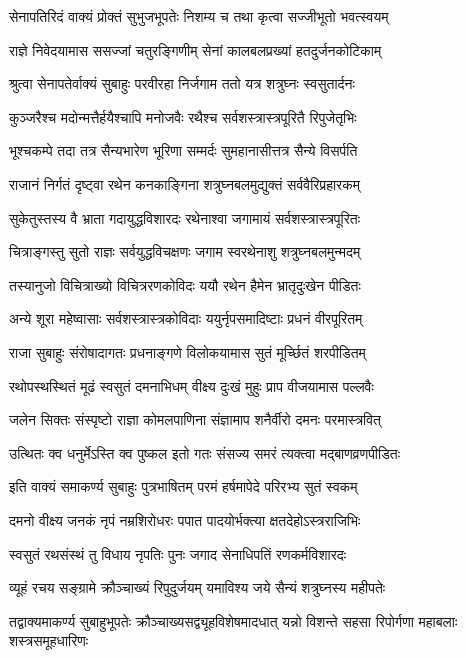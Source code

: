 \twolineshloka
{सेनापतिरिदं वाक्यं प्रोक्तं सुभुजभूपतेः}
{निशम्य च तथा कृत्वा सज्जीभूतो भवत्स्वयम्}%

\twolineshloka
{राज्ञे निवेदयामास ससज्जां चतुरङ्गिणीम्}
{सेनां कालबलप्रख्यां हतदुर्जनकोटिकाम्}%

\twolineshloka
{श्रुत्वा सेनापतेर्वाक्यं सुबाहुः परवीरहा}
{निर्जगाम ततो यत्र शत्रुघ्नः स्वसुतार्दनः}%

\twolineshloka
{कुञ्जरैश्च मदोन्मत्तैर्हयैश्चापि मनोजवैः}
{रथैश्च सर्वशस्त्रास्त्रपूरितै रिपुजेतृभिः}%

\twolineshloka
{भूश्चकम्पे तदा तत्र सैन्यभारेण भूरिणा}
{सम्मर्दः सुमहानासीत्तत्र सैन्ये विसर्पति}%

\twolineshloka
{राजानं निर्गतं दृष्ट्वा रथेन कनकाङ्गिना}
{शत्रुघ्नबलमुद्युक्तं सर्ववैरिप्रहारकम्}%

\twolineshloka
{सुकेतुस्तस्य वै भ्राता गदायुद्धविशारदः}
{रथेनाश्वा जगामायं सर्वशस्त्रास्त्रपूरितः}%

\twolineshloka
{चित्राङ्गस्तु सुतो राज्ञः सर्वयुद्धविचक्षणः}
{जगाम स्वरथेनाशु शत्रुघ्नबलमुन्मदम्}%

\twolineshloka
{तस्यानुजो विचित्राख्यो विचित्ररणकोविदः}
{ययौ रथेन हैमेन भ्रातृदुःखेन पीडितः}%

\twolineshloka
{अन्ये शूरा महेष्वासाः सर्वशस्त्रास्त्रकोविदाः}
{ययुर्नृपसमादिष्टाः प्रधनं वीरपूरितम्}%

\twolineshloka
{राजा सुबाहुः संरोषादागतः प्रधनाङ्गणे}
{विलोकयामास सुतं मूर्च्छितं शरपीडितम्}%

\twolineshloka
{रथोपस्थस्थितं मूढं स्वसुतं दमनाभिधम्}
{वीक्ष्य दुःखं मुहुः प्राप वीजयामास पल्लवैः}%

\twolineshloka
{जलेन सिक्तः संस्पृष्टो राज्ञा कोमलपाणिना}
{संज्ञामाप शनैर्वीरो दमनः परमास्त्रवित्}%

\twolineshloka
{उत्थितः क्व धनुर्मेऽस्ति क्व पुष्कल इतो गतः}
{संसज्य समरं त्यक्त्वा मद्बाणव्रणपीडितः}%

\twolineshloka
{इति वाक्यं समाकर्ण्य सुबाहुः पुत्रभाषितम्}
{परमं हर्षमापेदे परिरभ्य सुतं स्वकम्}%

\twolineshloka
{दमनो वीक्ष्य जनकं नृपं नम्रशिरोधरः}
{पपात पादयोर्भक्त्या क्षतदेहोऽस्त्रराजिभिः}%

\twolineshloka
{स्वसुतं रथसंस्थं तु विधाय नृपतिः पुनः}
{जगाद सेनाधिपतिं रणकर्मविशारदः}%

\twolineshloka
{व्यूहं रचय सङ्ग्रामे क्रौञ्चाख्यं रिपुदुर्जयम्}
{यमाविश्य जये सैन्यं शत्रुघ्नस्य महीपतेः}%

\fourlineindentedshloka
{तद्वाक्यमाकर्ण्य सुबाहुभूपतेः}
{क्रौञ्चाख्यसद्व्यूहविशेषमादधात्}
{यन्नो विशन्ते सहसा रिपोर्गणा}
{महाबलाः शस्त्रसमूहधारिणः}%

